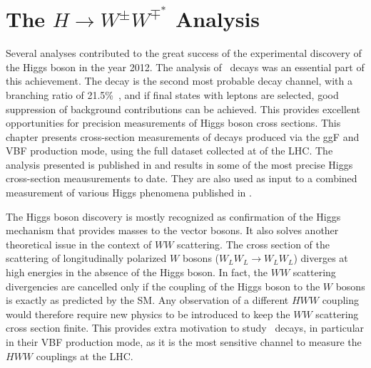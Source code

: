 \chapter{The $H\rightarrow W^{\pm}W^{\mp^*}$ Analysis}
\label{chap:hww}


Several analyses contributed to the great success of the experimental discovery of the Higgs boson in the year 2012. The analysis of \HWWdet\ decays was an essential part of this achievement. 
The \HWW decay is the second most probable decay channel, with a branching ratio of 21.5\%~\cite{PDG2020}, and if final states with leptons are selected, good suppression of background contributions can be achieved.
This provides excellent opportunities for precision measurements of Higgs boson cross sections.
This chapter presents cross-section measurements of \HWWdet decays produced via the ggF and VBF production mode, using the full dataset collected at \RunTwo of the LHC. 
The analysis presented is published in  and results in some of the most precise Higgs cross-section meausurements to date. 
They are also used as input to a combined measurement of various Higgs phenomena published in .

The Higgs boson discovery is mostly recognized as confirmation of the Higgs mechanism that provides masses to the vector bosons. 
It also solves another theoretical issue in the context of $WW$ scattering.
The cross section of the scattering of longitudinally polarized $W$ bosons ($W_LW_L \to W_LW_L$) diverges at high energies in the absence of the Higgs boson. In fact, the $WW$ scattering divergencies are cancelled only if the coupling of the Higgs boson to the $W$ bosons is exactly as predicted by the SM. Any observation of a different $HWW$ coupling would therefore require new physics to be introduced to keep the $WW$ scattering cross section finite. 
This provides extra motivation to study \HWW\ decays, in particular in their VBF production mode, as it is the most sensitive channel to measure the $HWW$ couplings at the LHC.

